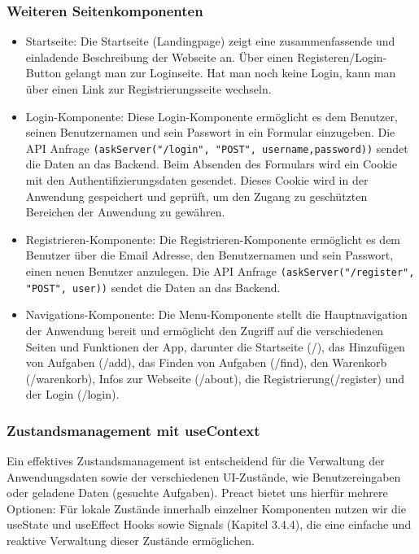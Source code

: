 \subsubsection{Weiteren Seitenkomponenten}

\begin{itemize}
\item Startseite:
 Die Startseite (Landingpage) zeigt eine zusammenfassende und einladende Beschreibung der Webseite an. Über einen Registeren/Login-Button gelangt man zur Loginseite. Hat man noch keine Login, kann man über einen Link zur Registrierungsseite wechseln.

\item Login-Komponente:
Diese Login-Komponente ermöglicht es dem Benutzer, seinen Benutzernamen und sein Passwort in ein Formular einzugeben. Die API Anfrage \texttt{(askServer("/login", "POST", {username,password}))} sendet die Daten an das Backend.
Beim Absenden des Formulars wird ein Cookie mit den Authentifizierungsdaten gesendet. Dieses Cookie wird in der Anwendung gespeichert und geprüft, um den Zugang zu geschützten Bereichen der Anwendung zu gewähren.


\item Registrieren-Komponente:
Die Registrieren-Komponente ermöglicht es dem Benutzer über die Email Adresse, den Benutzernamen und sein Passwort, einen neuen Benutzer anzulegen. Die API Anfrage \texttt{(askServer("/register", "POST", user))} sendet die Daten an das Backend.

\item Navigations-Komponente:
Die Menu-Komponente stellt die Hauptnavigation der Anwendung bereit und ermöglicht den Zugriff auf die verschiedenen Seiten und Funktionen der App, darunter die Startseite (/), das Hinzufügen von Aufgaben (/add), das Finden von Aufgaben (/find), den Warenkorb (/warenkorb), Infos zur Webseite (/about), die Registrierung(/register) und der Login (/login).


\end{itemize}



\subsubsection{Zustandsmanagement mit useContext } 

Ein effektives Zustandsmanagement ist entscheidend für die Verwaltung der Anwendungsdaten sowie der verschiedenen UI-Zustände, wie Benutzereingaben oder geladene Daten (gesuchte Aufgaben). Preact bietet uns hierfür mehrere Optionen: Für lokale Zustände innerhalb einzelner Komponenten nutzen wir die useState und useEffect Hooks sowie Signals (Kapitel 3.4.4), die eine einfache und reaktive Verwaltung dieser Zustände ermöglichen. 


